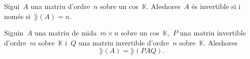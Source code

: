 \documentclass[../../Main.tex]{subfiles}
\begin{document}
	\begin{corollary}
		Sigui~\(A\) una matriu d'ordre~\(n\) sobre un cos~\(\mathbb{K}\).
		Aleshores~\(A\) és invertible si i només si~\(\rang(A)=n\).
	\end{corollary}
	\begin{observation}
		\label{obs:rang d'una matriu és invariant pel producte amb invertibles}
		Siguin~\(A\) una matriu de mida~\(m\times n\) sobre un cos~\(\mathbb{K}\),~\(P\) una matriu invertible d'ordre~\(m\) sobre~\(\mathbb{K}\) i~\(Q\) una matriu invertible d'ordre~\(n\) sobre~\(\mathbb{K}\).
		Aleshores
		\[
		    \rang(A)=\rang(PAQ).
		\]
	\end{observation}
%
\end{document}
